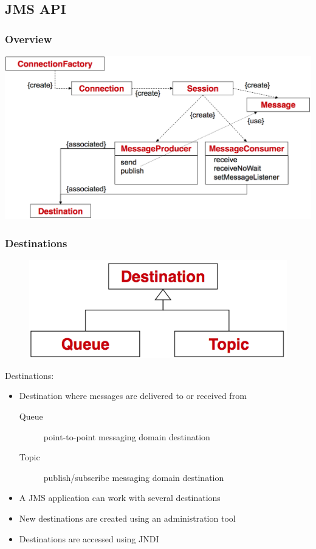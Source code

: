 \documentclass[10pt]{article}
\begin{document}
\subsection{JMS API}
\subsubsection{Overview}
\begin{center}
	\includegraphics[scale=0.25]{jms-api-overview.png}
\end{center}
\subsubsection{Destinations}
\begin{figure}
	\centering
	\includegraphics[scale=0.2]{jms-api-destination.png}%
\end{figure}
Destinations:
\begin{itemize}
	\item Destination where messages are delivered to or received from
		\begin{description}
			\item[Queue] point-to-point messaging domain destination
			\item[Topic] publish/subscribe messaging domain destination
		\end{description}
	\item A JMS application can work with several destinations
	\item New destinations are created using an administration tool
	\item Destinations are accessed using JNDI
\end{itemize}
\end{document}
